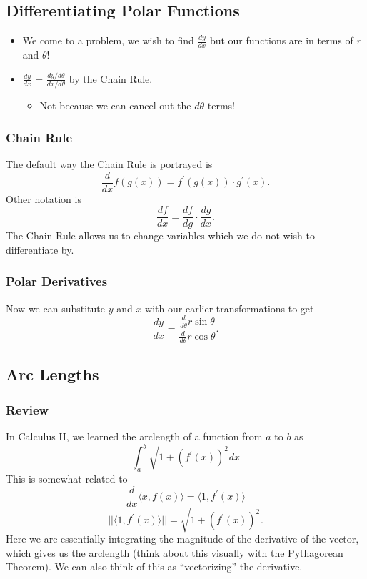 \documentclass[12pt]{article}
\theoremstyle{plain} %
\theoremstyle{definition}
\theoremstyle{definition}
\theoremstyle{definition}
\theoremstyle{remark}
\begin{document}
\subsection{Differentiating Polar Functions}
\begin{itemize}
    \item We come to a problem, we wish to find $\frac{dy}{dx}$ but our functions are in terms of $r$ and $\theta$!
    \item $\frac{dy}{dx}$ = $\frac{dy/d\theta}{dx/d\theta}$ by the Chain Rule.
    \begin{itemize}
        \item Not because we can cancel out the $d\theta$ terms!
    \end{itemize}
\end{itemize}

\subsubsection{Chain Rule}
The default way the Chain Rule is portrayed is
\[ \frac{d}{dx} f(g(x)) = f^\prime(g(x)) \cdot g^\prime(x) \text{.} \]
Other notation is
\[ \frac{df}{dx} = \frac{df}{dg} \cdot \frac{dg}{dx} \text{.} \]
The Chain Rule allows us to change variables which we do not wish to differentiate by.
\subsubsection{Polar Derivatives}
Now we can substitute $y$ and $x$ with our earlier transformations to get
\[ \frac{dy}{dx} = \frac{\frac{d}{d\theta}r\sin{\theta}}{\frac{d}{d\theta}r\cos{\theta}} \text{.} \]

\subsection{Arc Lengths}
\subsubsection{Review}
In Calculus II, we learned the arclength of a function from $a$ to $b$ as
\[ \int_a^b{\sqrt{1+(f^\prime(x))^2}dx} \]
This is somewhat related to
\[ \frac{d}{dx} \langle x,f(x) \rangle = \langle 1,f^\prime(x) \rangle \]
\[ || \langle1, f^\prime(x) \rangle || = \sqrt{1+(f^\prime(x))^2} \text{.} \]
Here we are essentially integrating the magnitude of the derivative of the vector, which gives us the arclength (think about this visually with the Pythagorean Theorem).
We can also think of this as ``vectorizing'' the derivative.
\end{document}
